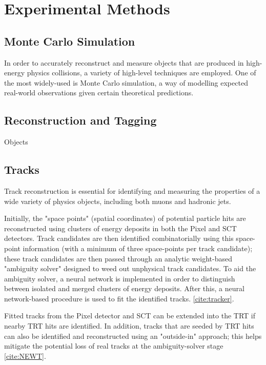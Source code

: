 \section{Experimental Methods} \label{sec:methods} 

\subsection{Monte Carlo Simulation} \label{sec:MC} 
In order to accurately reconstruct and measure objects that are produced in high-energy physics collisions, a variety of high-level techniques are employed. One of the most widely-used is Monte Carlo simulation, a way of modelling expected real-world observations given certain theoretical predictions. 



\subsection{Reconstruction and Tagging} \label{sec:Reco} 

Objects 


\subsection{Tracks} \label{sec:Tracks} 

Track reconstruction is essential for identifying and measuring the properties of a wide variety of physics objects, including both muons and hadronic jets.

Initially, the "space points" (spatial coordinates) of potential particle hits are reconstructed using clusters of energy deposits in both the Pixel and SCT detectors. Track candidates are then identified combinatorially using this space-point information (with a minimum of three space-points per track candidate); these track candidates are then passed through an analytic weight-based "ambiguity solver" designed to weed out unphysical track candidates. To aid the ambiguity solver, a neural network is implemented in order to distinguish between isolated and merged clusters of energy deposits. After this, a neural network-based procedure is used to fit the identified tracks. \ref{cite:tracker}.

Fitted tracks from the Pixel detector and SCT can be extended into the TRT if nearby TRT hits are identified. In addition, tracks that are seeded by TRT hits can also be identified and reconstructed using an "outside-in" approach; this helps mitigate the potential loss of real tracks at the ambiguity-solver stage \ref{cite:NEWT}.

